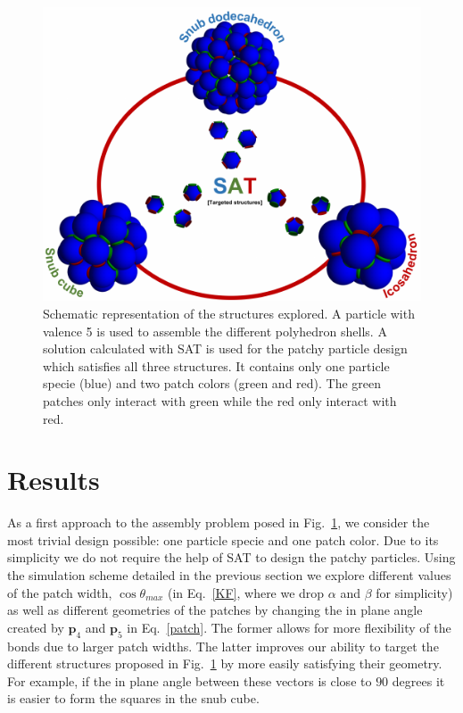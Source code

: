 \documentclass[a4paper, amsfonts, amssymb, amsmath, reprint, showkeys, nofootinbib, twoside]{revtex4-1}
\begin{document}
\begin{figure}[t]
	\includegraphics{fig1.pdf}
	\caption{\label{SAT} Schematic representation of the structures explored. A particle with valence 5 is used to assemble the different polyhedron shells. A solution calculated with SAT is used for the patchy particle design which satisfies all three structures. It contains only one particle specie (blue) and two patch colors (green and red). The green patches only interact with green while the red only interact with red.}
\end{figure}

\section{Results}

As a first approach to the assembly problem posed in Fig.~\ref{SAT}, we consider the most trivial design possible: one particle specie and one patch color. Due to its simplicity we do not require the help of SAT to design the patchy particles. Using the simulation scheme detailed in the previous section we explore different values of the patch width, $\cos\theta_{max}$ (in Eq.~\ref{KF}, where we drop $\alpha$ and $\beta$ for simplicity) as well as different geometries of the patches by changing the in plane angle created by $\textbf{p}_4$ and $\textbf{p}_5$ in Eq.~\ref{patch}. The former allows for more flexibility of the bonds due to larger patch widths. The latter improves our ability to target the different structures proposed in Fig.~\ref{SAT} by more easily satisfying their geometry. For example, if the in plane angle between these vectors is close to $90$ degrees it is easier to form the squares in the snub cube.
\end{document}

